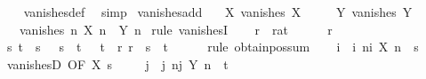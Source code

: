 \begin{isabellebody}
%
\isadelimproof
\ \ %
\endisadelimproof
%
\isatagproof
{}\isamarkupfalse%
\ vanishes{\isacharunderscore}{\kern0pt}def\ \isamarkupfalse%
\ simp%
\endisatagproof
{\isafoldproof}%
%
\isadelimproof
\isanewline
%
\endisadelimproof
\isanewline
{}\isamarkupfalse%
\ vanishes{\isacharunderscore}{\kern0pt}add{\isacharcolon}{\kern0pt}\isanewline
\ \ \ X{\isacharcolon}{\kern0pt}\ {\isachardoublequoteopen}vanishes\ X{\isachardoublequoteclose}\isanewline
\ \ \ \ \ Y{\isacharcolon}{\kern0pt}\ {\isachardoublequoteopen}vanishes\ Y{\isachardoublequoteclose}\isanewline
\ \ \ {\isachardoublequoteopen}vanishes\ {\isacharparenleft}{\kern0pt}{\isasymlambda}n{\isachardot}{\kern0pt}\ X\ n\ {\isacharplus}{\kern0pt}\ Y\ n{\isacharparenright}{\kern0pt}{\isachardoublequoteclose}\isanewline
%
\isadelimproof
%
\endisadelimproof
%
\isatagproof
{}\isamarkupfalse%
\ {\isacharparenleft}{\kern0pt}rule\ vanishesI{\isacharparenright}{\kern0pt}\isanewline
\ \ \isamarkupfalse%
\ r\ {\isacharcolon}{\kern0pt}{\isacharcolon}{\kern0pt}\ rat\isanewline
\ \ \isamarkupfalse%
\ {\isachardoublequoteopen}{}\ {\isacharless}{\kern0pt}\ r{\isachardoublequoteclose}\isanewline
\ \ \isamarkupfalse%
\ \isamarkupfalse%
\ s\ t\ \ s{\isacharcolon}{\kern0pt}\ {\isachardoublequoteopen}{}\ {\isacharless}{\kern0pt}\ s{\isachardoublequoteclose}\ \ t{\isacharcolon}{\kern0pt}\ {\isachardoublequoteopen}{}\ {\isacharless}{\kern0pt}\ t{\isachardoublequoteclose}\ \ r{\isacharcolon}{\kern0pt}\ {\isachardoublequoteopen}r\ {\isacharequal}{\kern0pt}\ s\ {\isacharplus}{\kern0pt}\ t{\isachardoublequoteclose}\isanewline
\ \ \ \ \isamarkupfalse%
\ {\isacharparenleft}{\kern0pt}rule\ obtain{\isacharunderscore}{\kern0pt}pos{\isacharunderscore}{\kern0pt}sum{\isacharparenright}{\kern0pt}\isanewline
\ \ \isamarkupfalse%
\ i\ \ i{\isacharcolon}{\kern0pt}\ {\isachardoublequoteopen}{\isasymforall}n{\isasymge}i{\isachardot}{\kern0pt}\ {\isasymbar}X\ n{\isasymbar}\ {\isacharless}{\kern0pt}\ s{\isachardoublequoteclose}\isanewline
\ \ \ \ \isamarkupfalse%
\ vanishesD\ {\isacharbrackleft}{\kern0pt}OF\ X\ s{\isacharbrackright}{\kern0pt}\ \isacommand{{\isachardot}{\kern0pt}{\isachardot}{\kern0pt}}\isamarkupfalse%
\isanewline
\ \ \isamarkupfalse%
\ j\ \ j{\isacharcolon}{\kern0pt}\ {\isachardoublequoteopen}{\isasymforall}n{\isasymge}j{\isachardot}{\kern0pt}\ {\isasymbar}Y\ n{\isasymbar}\ {\isacharless}{\kern0pt}\ t{\isachardoublequoteclose}\isanewline

\end{isabellebody}
